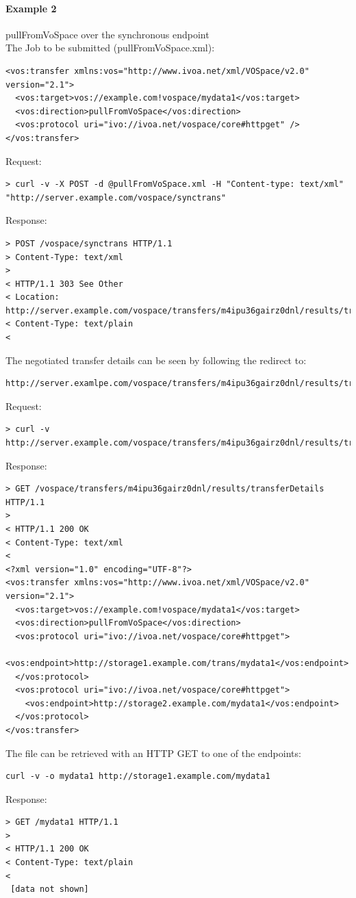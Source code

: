 \documentclass[11pt,a4paper]{ivoa}
\begin{document}
\paragraph{Example 2}
pullFromVoSpace over the synchronous endpoint
\\[5px]
\noindent
The Job to be submitted (pullFromVoSpace.xml):
\begin{lstlisting}
<vos:transfer xmlns:vos="http://www.ivoa.net/xml/VOSpace/v2.0" version="2.1">
  <vos:target>vos://example.com!vospace/mydata1</vos:target>
  <vos:direction>pullFromVoSpace</vos:direction>
  <vos:protocol uri="ivo://ivoa.net/vospace/core#httpget" />
</vos:transfer>
\end{lstlisting}
Request:
\begin{lstlisting}
> curl -v -X POST -d @pullFromVoSpace.xml -H "Content-type: text/xml" "http://server.example.com/vospace/synctrans"
\end{lstlisting}
Response:
\begin{lstlisting}
> POST /vospace/synctrans HTTP/1.1
> Content-Type: text/xml
>
< HTTP/1.1 303 See Other
< Location: http://server.example.com/vospace/transfers/m4ipu36gairz0dnl/results/transferDetails
< Content-Type: text/plain
<
\end{lstlisting}
The negotiated transfer details can be seen by following the redirect to:
\begin{lstlisting}
http://server.examlpe.com/vospace/transfers/m4ipu36gairz0dnl/results/transferDetails
\end{lstlisting}
Request:
\begin{lstlisting}
> curl -v http://server.example.com/vospace/transfers/m4ipu36gairz0dnl/results/transferDetails
\end{lstlisting}
Response:
\begin{lstlisting}
> GET /vospace/transfers/m4ipu36gairz0dnl/results/transferDetails HTTP/1.1
>
< HTTP/1.1 200 OK
< Content-Type: text/xml
<
<?xml version="1.0" encoding="UTF-8"?>
<vos:transfer xmlns:vos="http://www.ivoa.net/xml/VOSpace/v2.0" version="2.1">
  <vos:target>vos://example.com!vospace/mydata1</vos:target>
  <vos:direction>pullFromVoSpace</vos:direction>
  <vos:protocol uri="ivo://ivoa.net/vospace/core#httpget">
    <vos:endpoint>http://storage1.example.com/trans/mydata1</vos:endpoint>
  </vos:protocol>
  <vos:protocol uri="ivo://ivoa.net/vospace/core#httpget">
    <vos:endpoint>http://storage2.example.com/mydata1</vos:endpoint>
  </vos:protocol>
</vos:transfer>
\end{lstlisting}
The file can be retrieved with an HTTP GET to one of the endpoints:
\begin{lstlisting}
curl -v -o mydata1 http://storage1.example.com/mydata1
\end{lstlisting}
Response:
\begin{lstlisting}
> GET /mydata1 HTTP/1.1
>
< HTTP/1.1 200 OK
< Content-Type: text/plain
<
 [data not shown]
\end{lstlisting}
\end{document}
